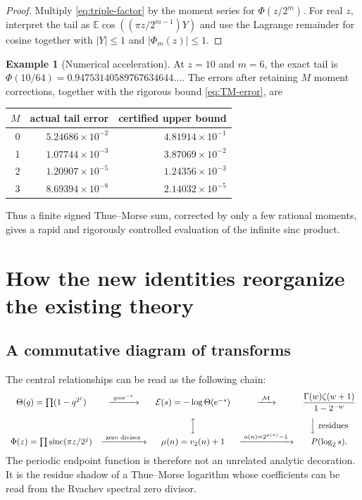 \documentclass[11pt,oneside]{article}
\theoremstyle{definition}
\newtheorem{example}[theorem]{Example}
\theoremstyle{remark}
\newcommand{\E}{\mathbb E}
\newcommand{\sinc}{\operatorname{sinc}}
\newcommand{\e}{\mathrm e}
\newcommand{\vtwo}{v_2}
\newcommand{\Mellin}{\mathcal M}
\begin{document}
\begin{proof}
Multiply \eqref{eq:triple-factor} by the moment series for
$\Phi(z/2^m)$.  For real $z$, interpret the tail as
$\E\cos((\pi z/2^{m-1})Y)$ and use the Lagrange remainder for cosine together with
$|Y|\le1$ and $|\Phi_m(z)|\le1$.
\end{proof}

\begin{example}[Numerical acceleration]
At $z=10$ and $m=6$, the exact tail is
$\Phi(10/64)=0.94753140589767634644\ldots$.  The errors after retaining $M$ moment
corrections, together with the rigorous bound \eqref{eq:TM-error}, are
\begin{center}
\begin{tabular}{@{}rrr@{}}
\toprule
$M$ & actual tail error & certified upper bound\\
\midrule
0 & $5.24686\times10^{-2}$ & $4.81914\times10^{-1}$\\
1 & $1.07744\times10^{-3}$ & $3.87069\times10^{-2}$\\
2 & $1.20907\times10^{-5}$ & $1.24356\times10^{-3}$\\
3 & $8.69394\times10^{-8}$ & $2.14032\times10^{-5}$\\
\bottomrule
\end{tabular}
\end{center}
Thus a finite signed Thue--Morse sum, corrected by only a few rational moments, gives a
rapid and rigorously controlled evaluation of the infinite sinc product.
\end{example}

\section{How the new identities reorganize the existing theory}

\subsection{A commutative diagram of transforms}
The central relationships can be read as the following chain:
\[
\begin{array}{ccccc}
 \Theta(q)=\prod(1-q^{2^j})
 &\xrightarrow{\ q=\e^{-s}\ }&
 \mathcal E(s)=-\log\Theta(\e^{-s})
 &\xrightarrow{\ \Mellin\ }&
 \dfrac{\Gamma(w)\zeta(w+1)}{1-2^{-w}}\\[1.2em]
 &&\Big\updownarrow&&\Big\downarrow\text{ residues}\\[-0.2em]
 \Phi(z)=\prod\sinc(\pi z/2^j)
 &\xrightarrow{\ \text{zero divisor}\ }&
 \mu(n)=\vtwo(n)+1
 &\xrightarrow{\ a(n)=2^{\mu(n)}-1\ }&
 P(\log_2s).
\end{array}
\]
The periodic endpoint function is therefore not an unrelated analytic decoration.  It is
the residue shadow of a Thue--Morse logarithm whose coefficients can be read from the
Rvachev spectral zero divisor.
\end{document}
